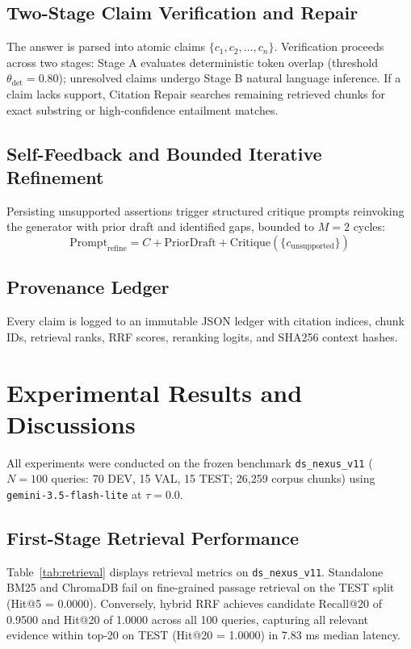\documentclass[conference]{IEEEtran}
\begin{document}
\subsection{Two-Stage Claim Verification and Repair}
The answer is parsed into atomic claims $\{c_1, c_2, \dots, c_n\}$. Verification proceeds across two stages: Stage A evaluates deterministic token overlap (threshold $\theta_{\text{det}} = 0.80$); unresolved claims undergo Stage B natural language inference. If a claim lacks support, Citation Repair searches remaining retrieved chunks for exact substring or high-confidence entailment matches.

\subsection{Self-Feedback and Bounded Iterative Refinement}
Persisting unsupported assertions trigger structured critique prompts reinvoking the generator with prior draft and identified gaps, bounded to $M=2$ cycles:
\begin{equation}
\text{Prompt}_{\text{refine}} = C + \text{PriorDraft} + \text{Critique}(\{c_{\text{unsupported}}\})
\end{equation}

\subsection{Provenance Ledger}
Every claim is logged to an immutable JSON ledger with citation indices, chunk IDs, retrieval ranks, RRF scores, reranking logits, and SHA256 context hashes.

\section{Experimental Results and Discussions}
All experiments were conducted on the frozen benchmark \texttt{ds\_nexus\_v11} ($N=100$ queries: 70 DEV, 15 VAL, 15 TEST; 26,259 corpus chunks) using \texttt{gemini-3.5-flash-lite} at $\tau = 0.0$.

\subsection{First-Stage Retrieval Performance}
Table~\ref{tab:retrieval} displays retrieval metrics on \texttt{ds\_nexus\_v11}. Standalone BM25 and ChromaDB fail on fine-grained passage retrieval on the TEST split (Hit@5 = 0.0000). Conversely, hybrid RRF achieves candidate Recall@20 of 0.9500 and Hit@20 of 1.0000 across all 100 queries, capturing all relevant evidence within top-20 on TEST (Hit@20 = 1.0000) in 7.83 ms median latency.
\end{document}

